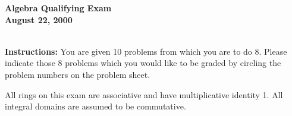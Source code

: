 \documentclass{article}
\begin{document}






\begin{center}\begin{LARGE}
{\bf  Algebra Qualifying Exam}\\ 
{\bf August 22, 2000}\\ \end{LARGE}
\end{center}
\vspace{0.1in}
\noindent\hrulefill\\
{\bf Instructions:} You are given 10 problems from which you are to do 8.
 Please indicate those  8 problems which you would like  to be graded 
by circling the problem numbers on the  problem sheet. 

 All rings on this exam are associative and
have multiplicative identity 1. All  integral domains are 
assumed to be commutative.
\vspace{0.2in}

\vs
\end{document}

